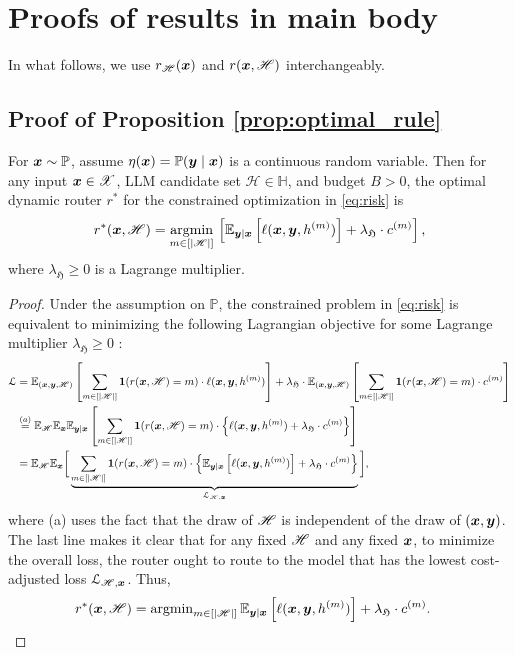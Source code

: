 \section{Proofs of results in main body}

In what follows, we use $r_{\mathscr{H}}(\boldsymbol{x})$ and $r(\boldsymbol{x}, \mathscr{H})$ interchangeably.

\subsection{Proof of Proposition \ref{prop:optimal_rule}}

\begin{prop*}[Restated]
For $\boldsymbol{x} \sim \mathbb{P}$, assume $\eta(\boldsymbol{x}) = \mathbb{P}(\boldsymbol{y} \mid \boldsymbol{x})$ is a continuous random variable. Then 
for any 
input
$\boldsymbol{x} \in \mathscr{X}$,
LLM candidate set $\mathscr{H} \in \mathbb{H}$,
and budget $B > 0$,
the optimal dynamic router $r^{*}$ for the constrained optimization
in \eqref{eq:risk} is
\begin{equation}
r^{*}(\boldsymbol{x}, \mathscr{H}) = \underset{m\in[ | \mathscr{H} | ]}{\operatorname{argmin}} \, \left[ \mathbb{E}_{\boldsymbol{y}\mid\boldsymbol{x}}\left[\ell(\boldsymbol{x},\boldsymbol{y},h^{(m)})\right]+\lambda_{\mathfrak{H}} \cdot c^{(m)} \right],
\end{equation}
where $\lambda_{\mathfrak{H}} \ge 0$ is a Lagrange multiplier.
\end{prop*}

\begin{proof}
Under the assumption on $\mathbb{P}$, the constrained problem in \eqref{eq:risk}
is equivalent to minimizing the following Lagrangian objective for
some Lagrange multiplier $\lambda_{\mathfrak{H}}\ge0$ \citep{neyman1933ix}:
\begin{align*}
\mathcal{L} & =\mathbb{E}_{(\bx,\by,\mset)}\left[\sum_{m\in[|\mathscr{H}|]}\1(r(\bx, \mathscr{H})=m)\cdot\ell(\bx,\by,h^{(m)})\right]+\lambda_{\mathfrak{H}}\cdot\mathbb{E}_{(\bx,\by,\mathscr{H})}\left[\sum_{m\in[|\mathscr{H}|]}\1(r(\bx, \mathscr{H})=m)\cdot c^{(m)}\right]\\
 & \stackrel{(a)}{=}\mathbb{E}_{\mset}\mathbb{E}_{\bx}\mathbb{E}_{\by|\bx}\left[\sum_{m\in[|\mathscr{H}|]}\1(r(\bx, \mathscr{H})=m)\cdot\left\{ \ell(\bx,\by,h^{(m)})+\lambda_{\mathfrak{H}}\cdot c^{(m)}\right\} %
 \right]\\
 & =\mathbb{E}_{\mset}\mathbb{E}_{\bx}\bigg[
 \underbrace{
 \sum_{m\in[|\mathscr{H}|]}\1(r(\bx, \mathscr{H})=m)\cdot\left\{ \mathbb{E}_{\by|\bx}\left[\ell(\bx,\by,h^{(m)})%
 \right]+\lambda_{\mathfrak{H}}\cdot c^{(m)}\right\}
 }_{\mathcal{L}_{\mset,\bx}}
 \bigg],
\end{align*}
where (a) uses the fact that the draw of $\mathscr{H}$ is independent of the draw of $(\boldsymbol{x},\boldsymbol{y})$. 
The last line makes it clear that for any fixed $\mathscr{H}$ %
and any fixed $\boldsymbol{x}$, to minimize the overall loss, the router ought to
route to the model that has the lowest cost-adjusted loss $\mathcal{L}_{\mathscr{H},\boldsymbol{x}}$. Thus, 
\begin{align*}
r^{*}(\boldsymbol{x}, \mathscr{H}) & =\operatorname{argmin}_{m\in[|\mathscr{H}|]}\mathbb{E}_{\boldsymbol{y}|\boldsymbol{x}}\left[\ell(\boldsymbol{x},\boldsymbol{y},h^{(m)})\right]+\lambda_{\mathfrak{H}}\cdot c^{(m)}.
\end{align*}
\end{proof}




